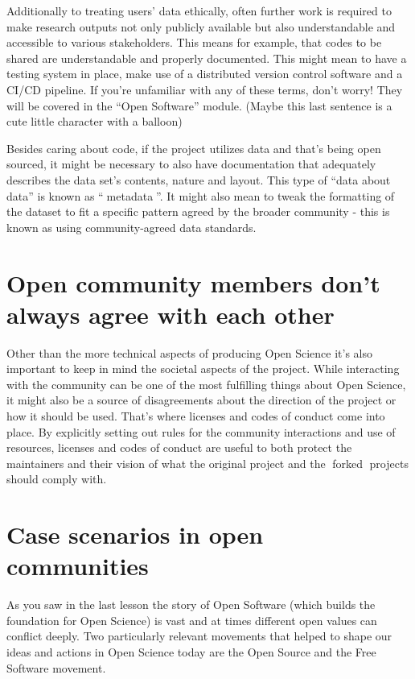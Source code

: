 \documentclass[
  letterpaper,
  DIV=11,
  numbers=noendperiod]{scrreport}
\begin{document}
Additionally to treating users' data ethically, often further work is
required to make research outputs not only publicly available but also
understandable and accessible to various stakeholders. This means for
example, that codes to be shared are understandable and properly
documented. This might mean to have a testing system in place, make use
of a distributed version control software and a CI/CD pipeline. If
you're unfamiliar with any of these terms, don't worry! They will be
covered in the ``Open Software'' module. (Maybe this last sentence is a
cute little character with a balloon)

Besides caring about code, if the project utilizes data and that's being
open sourced, it might be necessary to also have documentation that
adequately describes the data set's contents, nature and layout. This
type of ``data about data'' is known as ``📖metadata📖''. It might also
mean to tweak the formatting of the dataset to fit a specific pattern
agreed by the broader community - this is known as using
community-agreed data standards.

\hypertarget{open-community-members-dont-always-agree-with-each-other}{%
\section{Open community members don't always agree with each
other}\label{open-community-members-dont-always-agree-with-each-other}}

Other than the more technical aspects of producing Open Science it's
also important to keep in mind the societal aspects of the project.
While interacting with the community can be one of the most fulfilling
things about Open Science, it might also be a source of disagreements
about the direction of the project or how it should be used. That's
where licenses and codes of conduct come into place. By explicitly
setting out rules for the community interactions and use of resources,
licenses and codes of conduct are useful to both protect the maintainers
and their vision of what the original project and the 📖forked📖
projects should comply with.

\hypertarget{case-scenarios-in-open-communities}{%
\section{Case scenarios in open
communities}\label{case-scenarios-in-open-communities}}

As you saw in the last lesson the story of Open Software (which builds
the foundation for Open Science) is vast and at times different open
values can conflict deeply. Two particularly relevant movements that
helped to shape our ideas and actions in Open Science today are the Open
Source and the Free Software movement.
\end{document}
